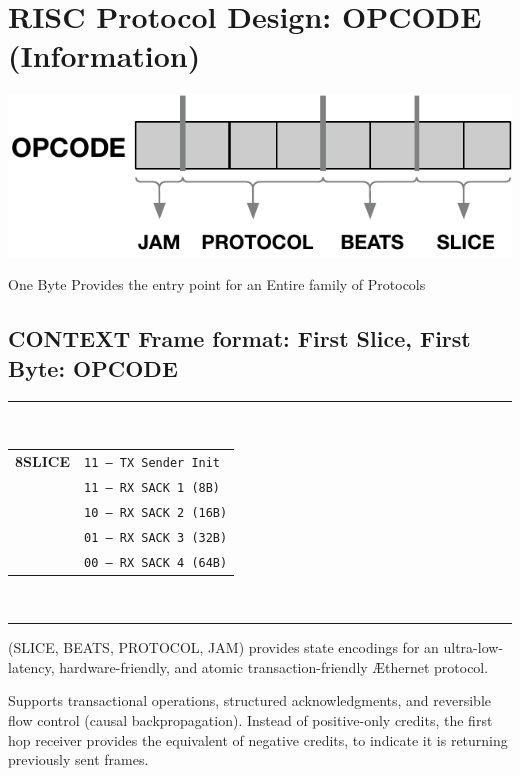 \documentclass[../HFT-main.tex]{subfiles}
\begin{document}
\newpage
\section{RISC Protocol Design: OPCODE (Information)}

\begin{marginfigure}
 \centering
  \includegraphics[width=1.1\linewidth]{../figures/opcode.pdf}
\caption{\centering One Byte Provides the entry point for  an Entire family of  Protocols}
\end{marginfigure}

\subsection{CONTEXT Frame format: First Slice, First Byte: OPCODE}

\begin{margintable}
  \footnotesize
  \rule{5.4cm}{0.8pt}\\
  \begin{tabular}{@{}cl@{}}
    \textbf{8SLICE} & \texttt{11 — TX Sender Init} \\
                   & \texttt{11 — RX SACK 1 (8B)} \\
                   & \texttt{10 — RX SACK 2 (16B)} \\
                   & \texttt{01 — RX SACK 3 (32B)} \\
                   & \texttt{00 — RX SACK 4 (64B)} \\
  \end{tabular}\\
  \rule{5.4cm}{0.6pt}
\end{margintable}

(SLICE, BEATS, PROTOCOL, JAM) provides state encodings for an ultra-low-latency, hardware-friendly, and atomic transaction-friendly \AE thernet protocol.

Supports transactional operations, structured acknowledgments, and reversible flow control (causal backpropagation). Instead of positive-only credits, the first hop receiver provides the equivalent of negative credits, to indicate it is returning previously sent frames. %
\end{document}
